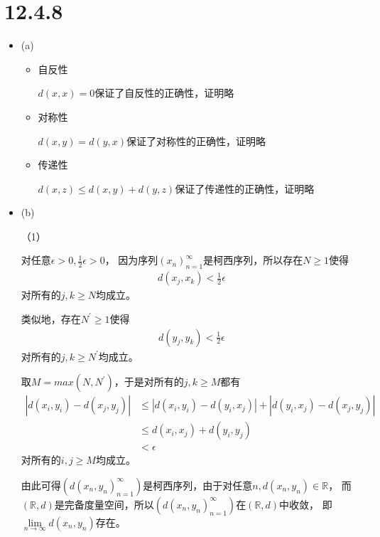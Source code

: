 \documentclass{article}
\begin{document}
\section*{12.4.8}

\begin{itemize}
  \item (a)

        \begin{itemize}
          \item 自反性

                $d(x,x) = 0$保证了自反性的正确性，证明略

          \item 对称性

                $d(x,y) = d(y,x)$保证了对称性的正确性，证明略

          \item 传递性

                $d(x,z) \leq d(x,y) + d(y,z)$保证了传递性的正确性，证明略
        \end{itemize}
  \item (b)

        （1）

        对任意$\epsilon > 0, \frac{1}{2}\epsilon > 0$，
        因为序列$(x_n)_{n=1}^\infty$是柯西序列，所以存在$N \geq 1$使得
        \begin{align*}
          d(x_j, x_k) < \frac{1}{2}\epsilon
        \end{align*}
        对所有的$j,k \geq N$均成立。

        类似地，存在$N^\prime \geq 1$使得
        \begin{align*}
          d(y_j, y_k) < \frac{1}{2}\epsilon
        \end{align*}
        对所有的$j,k \geq N^\prime$均成立。

        取$M = max(N, N^\prime)$，于是对所有的$j,k \geq M$都有
        \begin{align*}
          |d(x_i, y_i) - d(x_j, y_j)| & \leq |d(x_i, y_i) - d(y_i, x_j)| + |d(y_i, x_j) - d(x_j, y_j)| \\
                                      & \leq d(x_i, x_j) + d(y_i, y_j)                                 \\
                                      & < \epsilon
        \end{align*}
        对所有的$i,j \geq M$均成立。

        由此可得$(d(x_n, y_n)_{n = 1}^\infty)$是柯西序列，由于对任意$n, d(x_n, y_n) \in \mathbb{R}$，
        而$(\mathbb{R}, d)$是完备度量空间，所以$(d(x_n, y_n)_{n = 1}^\infty)$在$(\mathbb{R},d)$中收敛，
        即$\lim\limits_{n \to \infty} d(x_n, y_n)$存在。


\end{itemize}
\end{document}
